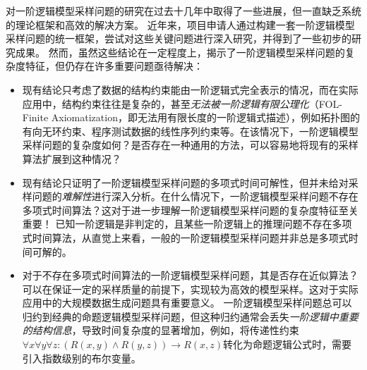 \documentclass[12pt,UTF8,AutoFakeBold=3,a4paper]{ctexart} %
\begin{document}

对一阶逻辑模型采样问题的研究在过去十几年中取得了一些进展，但一直缺乏系统的理论框架和高效的解决方案。
近年来，项目申请人通过构建一套一阶逻辑模型采样问题的统一框架，尝试对这些关键问题进行深入研究，并得到了一些初步的研究成果。
然而，虽然这些结论在一定程度上，揭示了一阶逻辑模型采样问题的复杂度特征，但仍存在许多重要问题亟待解决：
\begin{itemize}
  \item 现有结论只考虑了数据的结构约束能由一阶逻辑式完全表示的情况，而在实际应用中，结构约束往往是复杂的，甚至\emph{无法被一阶逻辑有限公理化}（FOL-Finite Axiomatization，即无法用有限长度的一阶逻辑式描述），例如拓扑图的有向无环约束、程序测试数据的线性序列约束等。在该情况下，一阶逻辑模型采样问题的复杂度如何？是否存在一种通用的方法，可以容易地将现有的采样算法扩展到这种情况？
  \item 现有结论只证明了一阶逻辑模型采样问题的多项式时间可解性，但并未给对采样问题的\emph{难解性}进行深入分析。在什么情况下，一阶逻辑模型采样问题不存在多项式时间算法？这对于进一步理解一阶逻辑模型采样问题的复杂度特征至关重要！
  已知一阶逻辑是非判定的，且某些一阶逻辑上的推理问题不存在多项式时间算法，从直觉上来看，一般的一阶逻辑模型采样问题并非总是多项式时间可解的。
  \item 对于不存在多项式时间算法的一阶逻辑模型采样问题，其是否存在近似算法？可以在保证一定的采样质量的前提下，实现较为高效的模型采样。这对于实际应用中的大规模数据生成问题具有重要意义。
  一阶逻辑模型采样问题总可以归约到经典的命题逻辑模型采样问题，但这种归约通常会丢失\emph{一阶逻辑中重要的结构信息}，导致时间复杂度的显著增加，例如，将传递性约束$\forall x\forall y\forall z: (R(x,y)\land R(y,z))\rightarrow R(x,z)$转化为命题逻辑公式时，需要引入指数级别的布尔变量。
\end{itemize}
\end{document}
